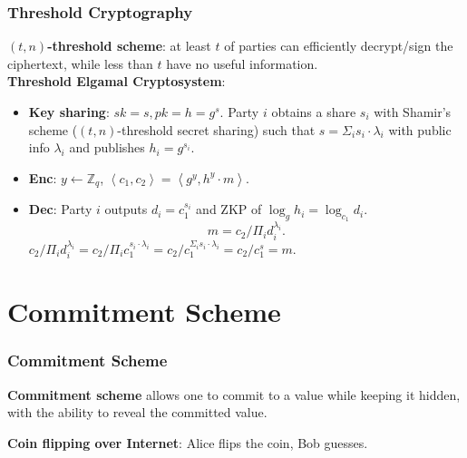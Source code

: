 \begin{frame}\frametitle{Threshold Cryptography}
\textbf{$(t,n)$-threshold scheme}: at least $t$ of parties can efficiently decrypt/sign the ciphertext, while less than $t$ have no useful information.\\

\textbf{Threshold Elgamal Cryptosystem}:
\begin{itemize}
\item \textbf{Key sharing}: $sk = s, pk=h=g^s$. Party $i$ obtains a share $s_i$ with Shamir's scheme  ($(t, n)$-threshold secret sharing) such that $s = \Sigma_i s_i\cdot \lambda_i$ with public info $\lambda_i$ and publishes $h_i = g^{s_i}$.
\item \textbf{Enc}: $y \gets \mathbb{Z}_q$, $\left<c_1,c_2\right>=\left<g^y,h^y\cdot m\right>$.
\item \textbf{Dec}: Party $i$ outputs $d_i = c_1^{s_i}$ and ZKP of $\log_gh_i = \log_{c_1} d_i$.
\[ m = c_2/\Pi_i d_i^{\lambda_i}. \]
$c_2/\Pi_i d_i^{\lambda_i} = c_2/\Pi_i c_1^{s_i\cdot \lambda_i} = c_2/c_1^{\Sigma_i s_i\cdot \lambda_i} = c_2/c_1^s=m.$
\end{itemize}
\end{frame}
\section{Commitment Scheme}
\begin{frame}\frametitle{Commitment Scheme}
\textbf{Commitment scheme} allows one to commit to a value while keeping it hidden, with the ability to reveal the committed value.
\newline

\textbf{Coin flipping over Internet}: Alice flips the coin, Bob guesses.
\begin{figure}
\begin{center}

\end{center}
\end{figure}
\end{frame}
